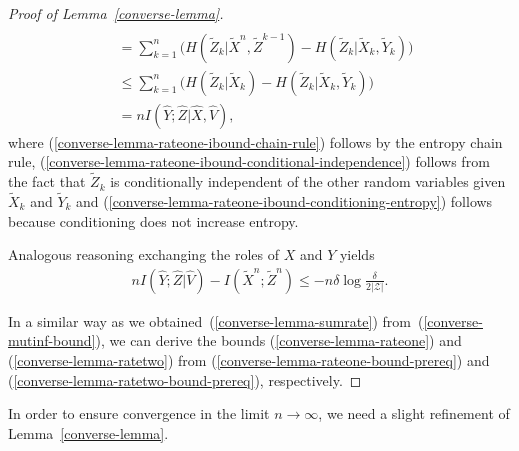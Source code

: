\documentclass[journal]{IEEEtran}
\newcommand{\lemmaconst}{\delta}
\newcommand{\channelInOne}{X}
\newcommand{\channelInTwo}{Y}
\newcommand{\channelOut}{Z}
\newcommand{\channelOutAlph}{\mathcal{Z}}
\newcommand{\codebookBlocklength}{n}
\newcommand{\blockIndex}{k}
\newcommand{\mutualInformation}[2]{I(#1;#2)}
\newcommand{\mutualInformationConditional}[3]{I(#1;#2|#3)}
\newcommand{\entropyConditional}[2]{H(#1 | #2)}
\newcommand{\cardinality}[1]{\lvert #1 \rvert}
\newcommand{\timeSharingRV}{V}
\begin{document}
\begin{proof}[Proof of Lemma~\ref{converse-lemma}]
\begin{align}
\\
&=
\sum_{\blockIndex=1}^\codebookBlocklength
  \Big(
    \entropyConditional{\tilde{\channelOut}_\blockIndex}{\tilde{\channelInOne}^\codebookBlocklength, \tilde{\channelOut}^{\blockIndex-1}}
    -
    \entropyConditional{\tilde{\channelOut}_\blockIndex}{\tilde{\channelInOne}_\blockIndex, \tilde{\channelInTwo}_\blockIndex}
  \Big)
\label{converse-lemma-rateone-ibound-conditional-independence}
\\
&\leq
\sum_{\blockIndex=1}^\codebookBlocklength
  \Big(
    \entropyConditional{\tilde{\channelOut}_\blockIndex}{\tilde{\channelInOne}_\blockIndex}
    -
    \entropyConditional{\tilde{\channelOut}_\blockIndex}{\tilde{\channelInOne}_\blockIndex, \tilde{\channelInTwo}_\blockIndex}
  \Big)
\label{converse-lemma-rateone-ibound-conditioning-entropy}
\\
&=
\codebookBlocklength
\mutualInformationConditional{\hat{\channelInTwo}}{\hat{\channelOut}}{\hat{\channelInOne}, \hat{\timeSharingRV}},
\nonumber
\end{align}
where (\ref{converse-lemma-rateone-ibound-chain-rule}) follows by the entropy chain rule, (\ref{converse-lemma-rateone-ibound-conditional-independence}) follows from the fact that $\tilde{\channelOut}_\blockIndex$ is conditionally independent of the other random variables given $\tilde{\channelInOne}_\blockIndex$ and $\tilde{\channelInTwo}_\blockIndex$ and (\ref{converse-lemma-rateone-ibound-conditioning-entropy}) follows because conditioning does not increase entropy.

Analogous reasoning exchanging the roles of $\channelInOne$ and $\channelInTwo$ yields
\begin{align}
\label{converse-lemma-ratetwo-bound-prereq}
\codebookBlocklength
\mutualInformationConditional{\hat{\channelInTwo}}{\hat{\channelOut}}{\hat{\timeSharingRV}}
-
\mutualInformation{\tilde{\channelInOne}^\codebookBlocklength}{\tilde{\channelOut}^\codebookBlocklength}
\leq
-
\codebookBlocklength
\lemmaconst
\log
\frac{\lemmaconst}{2\cardinality{\channelOutAlph}}.
\end{align}

In a similar way as we obtained~(\ref{converse-lemma-sumrate}) from~(\ref{converse-mutinf-bound}), we can derive the bounds (\ref{converse-lemma-rateone}) and (\ref{converse-lemma-ratetwo}) from (\ref{converse-lemma-rateone-bound-prereq}) and (\ref{converse-lemma-ratetwo-bound-prereq}), respectively.
\end{proof}

In order to ensure convergence in the limit $\codebookBlocklength \rightarrow \infty$, we need a slight refinement of Lemma~\ref{converse-lemma}.
\end{document}
